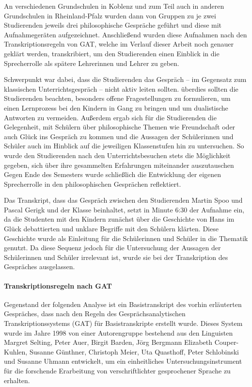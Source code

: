 An verschiedenen Grundschulen in Koblenz und zum Teil auch in anderen Grundschulen in Rheinland-Pfalz wurden dann von Gruppen zu je zwei Studierenden jeweils drei philosophische Gespräche geführt und diese mit Aufnahmegeräten aufgezeichnet. 
Anschließend wurden diese Aufnahmen nach den Transkriptionsregeln von GAT, welche im Verlauf dieser Arbeit noch genauer geklärt werden, transkribiert, um den Studierenden einen Einblick in die Sprecherrolle als spätere Lehrerinnen und Lehrer zu geben. 

Schwerpunkt war dabei, dass die Studierenden das Gespräch -- im Gegensatz zum klassischen Unterrichtsgespräch -- nicht aktiv leiten sollten. 
überdies sollten die Studierenden beachten, besonders offene Fragestellungen zu formulieren, um einen Lernprozess bei den Kindern in Gang zu bringen und um dualistische Antworten zu vermeiden. 
Außerdem ergab sich für die Studierenden die Gelegenheit, mit Schülern über philosophische Themen wie Freundschaft oder auch Glück ins Gespräch zu kommen und die Aussagen der Schülerinnen und Schüler auch im Hinblick auf die jeweiligen Klassenstufen hin zu untersuchen. 
So wurde den Studierenden nach den Unterrichtsbesuchen stets die Möglichkeit gegeben, sich über ihre gesammelten Erfahrungen miteinander auszutauschen
Gegen Ende des Semesters wurde schließlich die Entwicklung der eigenen Sprecherrolle in den philosophischen Gesprächen reflektiert.

Das Transkript, dass das Gespräch zwischen den Studierenden Martin Spoo und Pascal Gerigk und der Klasse beinhaltet, setzt in Minute 6:30 der Aufnahme ein, da die Studenten mit den Kindern zunächst über die Geschichte von Hans im Glück debattierten und unklare Begriffe mit den Schülern klärten. 
Diese Geschichte wurde als Einleitung für die Schülerinnen und Schüler in die Thematik genutzt.
Da diese Sequenz jedoch für die Untersuchung der Aussagen der Schülerinnen und Schüler irrelevant ist, wurde sie bei der Transkription des Gespräches ausgelassen.


\paragraph{Transkriptionsregeln nach GAT}

Gegenstand der folgenden Analyse ist ein Basistranskript des vorhin erläuterten Gespräches, dass nach den Regeln des Gesprächsanalytischen Transkriptionssystems (GAT) für Basistranskripte erstellt wurde. 
Dieses System wurde im Jahre 1998 von einer Autorengruppe bestehend aus den Linguisten Margret Selting, Peter Auer, Birgit Barden, Jörg Bergmann Elizabeth Couper-Kuhlen, Susanne Günthner, Christoph Meier, Uta Quasthoff, Peter Schlobinski und Susanne Uhmann entwickelt, um ein einheitliches Untersuchungsinstrument für die forschende Erarbeitung von verschriftlichter gesprochener Sprache zu erhalten. 

